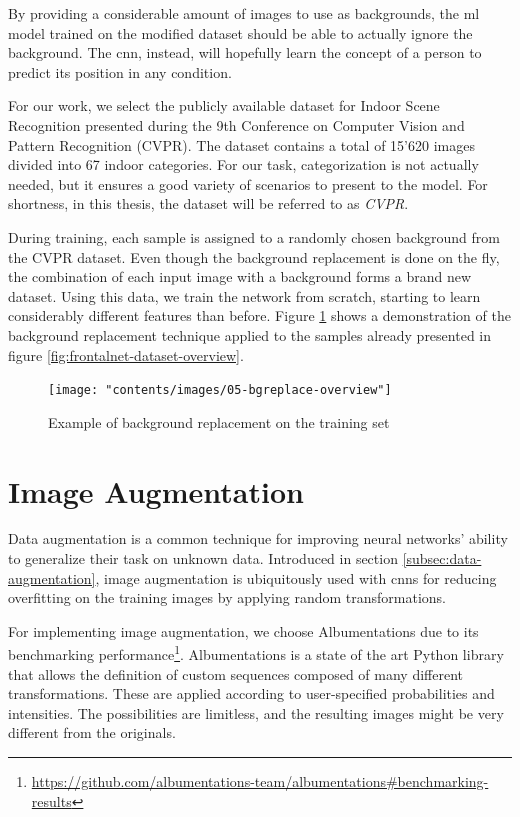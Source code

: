 By providing a considerable amount of images to use as backgrounds, the \gls{ml} model trained on the modified dataset should be able to actually ignore the background. The \gls{cnn}, instead, will hopefully learn the concept of a person to predict its position in any condition.

\medskip

For our work, we select the publicly available dataset \cite{cvpr09} for Indoor Scene Recognition presented during the 9th Conference on Computer Vision and Pattern Recognition (CVPR). The dataset contains a total of 15'620 images divided into 67 indoor categories. For our task, categorization is not actually needed, but it ensures a good variety of scenarios to present to the model. For shortness, in this thesis, the dataset will be referred to as \textit{CVPR}.

During training, each sample is assigned to a randomly chosen background from the CVPR dataset. Even though the background replacement is done on the fly, the combination of each input image with a background forms a brand new dataset. Using this data, we train the network from scratch, starting to learn considerably different features than before. Figure \ref{fig:bgreplace-example} shows a demonstration of the background replacement technique applied to the samples already presented in figure \ref{fig:frontalnet-dataset-overview}. 

\vspace*{5ex}
\begin{figure}[!h]
	\centering
	\texttt{[image: "contents/images/05-bgreplace-overview"]}
	\caption[Example of background replacement on the training set]{Example of background replacement on the training set}
	\label{fig:bgreplace-example}
\end{figure}
\clearpage




\section{Image Augmentation}
\label{sec:implementation-imgaug}

Data augmentation is a common technique for improving neural networks' ability to generalize their task on unknown data. Introduced in section \ref{subsec:data-augmentation}, image augmentation is ubiquitously used with \gls{cnn}s for reducing overfitting on the training images by applying random transformations.

For implementing image augmentation, we choose Albumentations \cite{Buslaev_2020} due to its benchmarking performance\footnote{\url{https://github.com/albumentations-team/albumentations\#benchmarking-results}}. Albumentations is a state of the art Python library that allows the definition of custom sequences composed of many different transformations. These are applied according to user-specified probabilities and intensities. The possibilities are limitless, and the resulting images might be very different from the originals.


